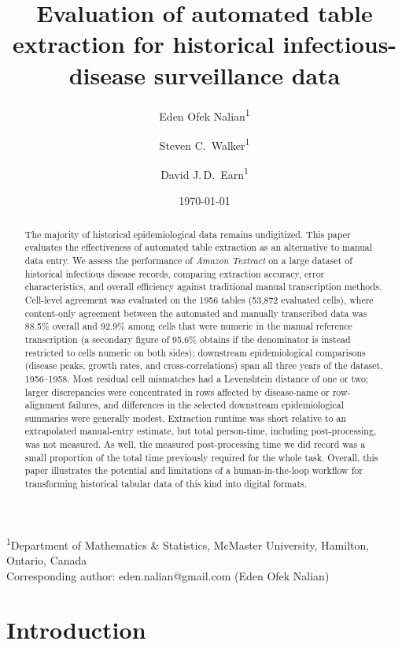 \documentclass[12pt]{article}
\title{Evaluation of automated table extraction for historical infectious-disease surveillance data}
\author{
  Eden Ofek Nalian\textsuperscript{1} \and
  Steven C.\ Walker\textsuperscript{1} \and
  David J.\,D.\ Earn\textsuperscript{1} 
}
\date{\today}
\begin{document}
\maketitle

\begin{center}
\small
\textsuperscript{1}Department of Mathematics \& Statistics, McMaster University, Hamilton, Ontario, Canada \\

Corresponding author: eden.nalian@gmail.com (Eden Ofek Nalian)

\end{center}




\begin{abstract}
The majority of historical epidemiological data remains undigitized. This paper evaluates the effectiveness of automated table extraction as an alternative to manual data entry. We assess the performance of \emph{Amazon Textract} on a large dataset of historical infectious disease records, comparing extraction accuracy, error characteristics, and overall efficiency against traditional manual transcription methods. Cell-level agreement was evaluated on the 1956 tables (53{,}872 evaluated cells), where content-only agreement between the automated and manually transcribed data was 88.5\% overall and 92.9\% among cells that were numeric in the manual reference transcription (a secondary figure of 95.6\% obtains if the denominator is instead restricted to cells numeric on both sides); downstream epidemiological comparisons (disease peaks, growth rates, and cross-correlations) span all three years of the dataset, 1956--1958. Most residual cell mismatches had a Levenshtein distance of one or two; larger discrepancies were concentrated in rows affected by disease-name or row-alignment failures, and differences in the selected downstream epidemiological summaries were generally modest. Extraction runtime was short relative to an extrapolated manual-entry estimate, but total person-time, including post-processing, was not measured. As well, the measured post-processing time we did record was a small proportion of the total time previously required for the whole task. Overall, this paper illustrates the potential and limitations of a human-in-the-loop workflow for transforming historical tabular data of this kind into digital formats.
\end{abstract}

\section{Introduction} \label{sec:intro}
\end{document}
